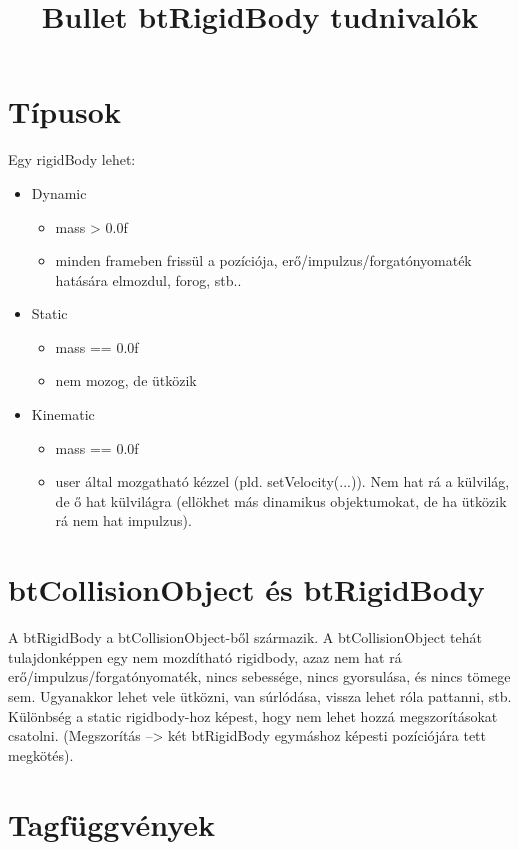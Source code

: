 \documentclass[12p,a4paper,notitlepage]{scrartcl}
\title{Bullet btRigidBody tudnivalók}
\subtitle{}
\date{}
\begin{document}
\maketitle

\section*{Típusok}

Egy rigidBody lehet:
\begin{itemize}
\item Dynamic
\begin{itemize}
\item mass > 0.0f
\item minden frameben frissül a pozíciója, erő/impulzus/forgatónyomaték hatására elmozdul, forog, stb..
\end{itemize}
\item Static
\begin{itemize}
\item mass == 0.0f
\item nem mozog, de ütközik
\end{itemize}
\item Kinematic
\begin{itemize}
\item mass == 0.0f
\item user által mozgatható kézzel (pld. setVelocity(...)). Nem hat rá a külvilág, de ő hat külvilágra (ellökhet más dinamikus objektumokat, de ha ütközik rá nem hat impulzus).
\end{itemize}
\end{itemize}

\section*{btCollisionObject és btRigidBody}
A btRigidBody a btCollisionObject-ből származik. A btCollisionObject tehát tulajdonképpen egy nem mozdítható rigidbody, azaz nem hat rá erő/impulzus/forgatónyomaték, nincs sebessége, nincs gyorsulása, és nincs tömege sem. Ugyanakkor lehet vele ütközni, van súrlódása, vissza lehet róla pattanni, stb. \newline
Különbség a static rigidbody-hoz képest, hogy nem lehet hozzá megszorításokat csatolni. (Megszorítás --> két btRigidBody egymáshoz képesti pozíciójára tett megkötés).


\section*{Tagfüggvények}
\end{document}
